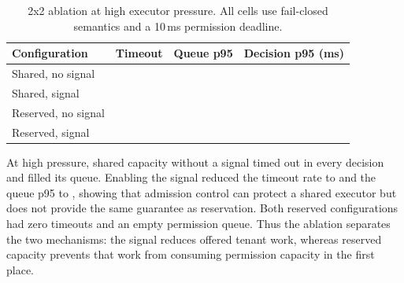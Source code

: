 \begin{table}[t]
\centering
\small
\caption{2x2 ablation at high executor pressure. All cells use fail-closed
semantics and a 10\,ms permission deadline.}
\label{tab:ccpe-ablation}
\begin{tabular}{lrrr}
\toprule
Configuration & Timeout & Queue p95 & Decision p95 (ms) \\
\midrule
Shared, no signal & \CCPEAblationHighSharedNoSignalTimeout{} & \CCPEAblationHighSharedNoSignalQueuePninetyfive{} & \CCPEAblationHighSharedNoSignalLatencyPninetyfive{} \\
Shared, signal & \CCPEAblationHighSharedSignalTimeout{} & \CCPEAblationHighSharedSignalQueuePninetyfive{} & \CCPEAblationHighSharedSignalLatencyPninetyfive{} \\
Reserved, no signal & \CCPEAblationHighIsolatedNoSignalTimeout{} & \CCPEAblationHighIsolatedNoSignalQueuePninetyfive{} & \CCPEAblationHighIsolatedNoSignalLatencyPninetyfive{} \\
Reserved, signal & \CCPEAblationHighIsolatedSignalTimeout{} & \CCPEAblationHighIsolatedSignalQueuePninetyfive{} & \CCPEAblationHighIsolatedSignalLatencyPninetyfive{} \\
\bottomrule
\end{tabular}
\end{table}

At high pressure, shared capacity without a signal timed out in every
decision and filled its queue. Enabling the signal reduced the timeout rate to
\CCPEAblationHighSharedSignalTimeout{} and the queue p95 to
\CCPEAblationHighSharedSignalQueuePninetyfive{}, showing that admission
control can protect a shared executor but does not provide the same guarantee
as reservation. Both reserved configurations had zero timeouts and an empty
permission queue. Thus the ablation separates the two mechanisms: the signal
reduces offered tenant work, whereas reserved capacity prevents that work
from consuming permission capacity in the first place.

